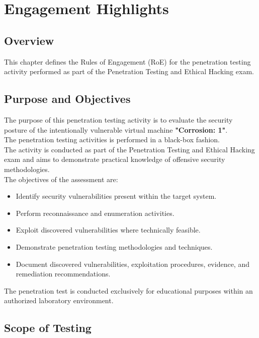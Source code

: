 \chapter{Engagement Highlights} \label{highlights}
\section{Overview}
This chapter defines the Rules of Engagement (RoE) for the penetration testing activity performed as part of the Penetration Testing and Ethical Hacking exam.

\section{Purpose and Objectives}
The purpose of this penetration testing activity is to evaluate the security posture of the intentionally vulnerable virtual machine \textbf{"Corrosion: 1"}.
\\

The penetration testing activities is performed in a black-box fashion.
\\

The activity is conducted as part of the Penetration Testing and Ethical Hacking exam and aims to demonstrate practical knowledge of offensive security methodologies.
\\

The objectives of the assessment are:

\begin{itemize}
    \item Identify security vulnerabilities present within the target system.
    \item Perform reconnaissance and enumeration activities.
    \item Exploit discovered vulnerabilities where technically feasible.
    \item Demonstrate penetration testing methodologies and techniques.
    \item Document discovered vulnerabilities, exploitation procedures,
    evidence, and remediation recommendations.
\end{itemize}

The penetration test is conducted exclusively for educational purposes within an authorized laboratory environment.

\section{Scope of Testing}
